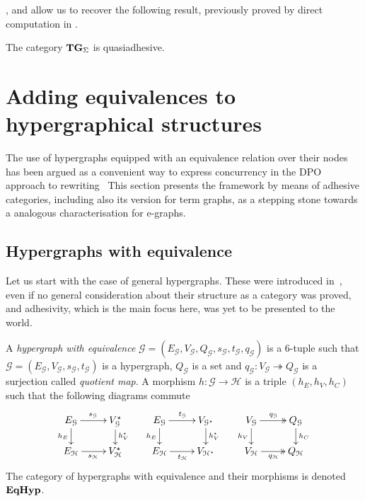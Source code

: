 \documentclass[a4paper,UKenglish,cleveref,pdftex,thm-restate,numberwithinsect]{lipics-v2021}
\newcommand{\catname}[1]{\textbf{\textup{#1}}}
\newcommand{\EqHyp}{\catname{EqHyp}} %
\newcommand{\tg}[0]{\catname{TG}_{\Sigma}}
\newcommand{\eto}{\twoheadrightarrow}
\begin{document}
,  and  allow us to recover the following result, previously proved by direct computation in \cite[Thm.~4.2]{CorradiniG05}.
\begin{corollary}\label{cor:term}
	The category $\tg$ is quasiadhesive.
\end{corollary}

\section{Adding equivalences to hypergraphical structures}
\label{hypereq}
The use of hypergraphs equipped with an equivalence relation over their nodes has been argued as a convenient way to express concurrency in the DPO approach to rewriting~\cite{concur2006}
This section presents the framework by means of adhesive categories, including also its version for term graphs, as a stepping stone towards a analogous characterisation for e-graphs.

\subsection{Hypergraphs with equivalence}

Let us start with the case of general hypergraphs. These were introduced in~\cite{concur2006}, even if no general consideration about their structure as a category was proved, and adhesivity, 
which is the main focus here, was yet to be presented to the world.

\begin{definition}
	A \emph{hypergraph with equivalence} $\mathcal{G} = (E_\mathcal{G}, V_{\mathcal{G}}, Q_\mathcal{G}, s_\mathcal{G}, t_\mathcal{G}, q_\mathcal{G})$ is a 6-tuple such that $\mathcal{G} = (E_\mathcal{G}, V_{\mathcal{G}}, s_\mathcal{G}, t_\mathcal{G})$ is a hypergraph, $Q_\mathcal{G}$ is a set and $q_{\mathcal{G}}: V_{\mathcal{G}}\eto Q_{\mathcal{G}}$ is a surjection called \emph{quotient map}. 
	A morphism $h\colon \mathcal{G\to H}$ is a triple $(h_E, h_V, h_C)$ such that the following diagrams commute
	\[\xymatrix@R=15pt{
		{E_\mathcal{G}}\ar[r]^{s_\mathcal{G}}\ar[d]_{h_E} & {V_{\mathcal{G}}^\star}\ar[d]^{h_V^\star} & {E_\mathcal{G}}\ar[r]^{t_\mathcal{G}}\ar[d]_{h_E} & {V_{\mathcal{G}^\star}}\ar[d]^{h_V^\star} & {V_\mathcal{G}}\ar@{>>}[r]^{q_\mathcal{G}}\ar[d]_{h_V} & {Q_{\mathcal{G}}} \ar[d]^{h_C} \\
		{E_\mathcal{H}}\ar[r]_{s_\mathcal{H}} & {V_{\mathcal{H}}^\star}	& {E_\mathcal{H}}\ar[r]_{t_\mathcal{H}} & {V_{\mathcal{H}^\star}}& {V_\mathcal{H}}\ar@{>>}[r]_{q_\mathcal{H}} & {Q_\mathcal{H}}
	}\]
	The category of hypergraphs with equivalence and their morphisms is denoted $\EqHyp$.
	
\end{definition}
\end{document}

